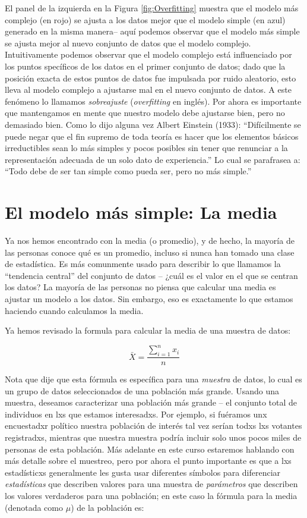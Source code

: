 \documentclass[
  12pt,
]{book}
\begin{document}
El panel de la izquierda en la Figura \ref{fig:Overfitting} muestra que el modelo más complejo (en rojo) se ajusta a los datos mejor que el modelo simple (en azul) generado en la misma manera-- aquí podemos observar que el modelo más simple se ajusta mejor al nuevo conjunto de datos que el modelo complejo. Intuitivamente podemos observar que el modelo complejo está influenciado por los puntos specíficos de los datos en el primer conjunto de datos; dado que la posición exacta de estos puntos de datos fue impulsada por ruido aleatorio, esto lleva al modelo complejo a ajustarse mal en el nuevo conjunto de datos. A este fenómeno lo llamamos \emph{sobreajuste} (\emph{overfitting} en inglés). Por ahora es importante que mantengamos en mente que nuestro modelo debe ajustarse bien, pero no demasiado bien. Como lo dijo alguna vez Albert Einstein (1933): ``Difícilmente se puede negar que el fin supremo de toda teoría es hacer que los elementos básicos irreductibles sean lo más simples y pocos posibles sin tener que renunciar a la representación adecuada de un solo dato de experiencia.'' Lo cual se parafrasea a: ``Todo debe de ser tan simple como pueda ser, pero no más simple.''

\hypertarget{el-modelo-muxe1s-simple-la-media}{%
\section{El modelo más simple: La media}\label{el-modelo-muxe1s-simple-la-media}}

Ya nos hemos encontrado con la media (o promedio), y de hecho, la mayoría de las personas conoce qué es un promedio, incluso si nunca han tomado una clase de estadística. Es más comunmente usado para describir lo que llamamos la ``tendencia central'' del conjunto de datos -- ¿cuál es el valor en el que se centran los datos? La mayoría de las personas no piensa que calcular una media es ajustar un modelo a los datos. Sin embargo, eso es exactamente lo que estamos haciendo cuando calculamos la media.

Ya hemos revisado la formula para calcular la media de una muestra de datos:

\[
\bar{X} = \frac{\sum_{i=1}^{n}x_i}{n}
\]

Nota que dije que esta fórmula es específica para una \emph{muestra} de datos, lo cual es un grupo de datos seleccionados de una población más grande. Usando una muestra, deseamos caracterizar una población más grande -- el conjunto total de individuos en lxs que estamos interesadxs. Por ejemplo, si fuéramos unx encuestadxr político nuestra población de interés tal vez serían todxs lxs votantes registradxs, mientras que nuestra muestra podría incluir solo unos pocos miles de personas de esta población. Más adelante en este curso estaremos hablando con más detalle sobre el muestreo, pero por ahora el punto importante es que a lxs estadísticxs generalmente les gusta usar diferentes símbolos para diferenciar \emph{estadísticas} que describen valores para una muestra de \emph{parámetros} que describen los valores verdaderos para una población; en este caso la fórmula para la media (denotada como \(\mu\)) de la población es:
\end{document}

